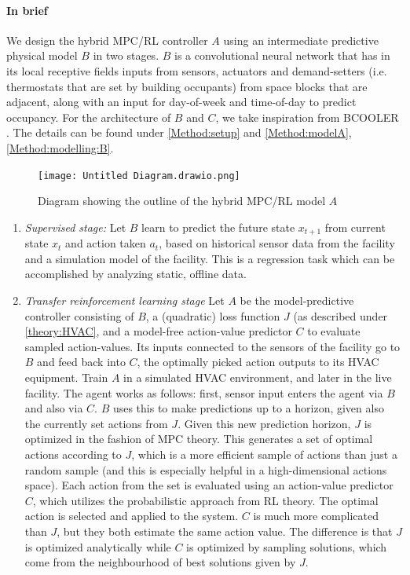 \documentclass{article}
\theoremstyle{definition}
\theoremstyle{remark}
\begin{document}
\paragraph{In brief} We design the hybrid MPC/RL controller $A$ using an intermediate predictive physical model $B$ in two stages. $B$ is a convolutional neural network that has in its local receptive fields inputs from sensors, actuators and demand-setters (i.e. thermostats that are set by building occupants) from space blocks that are adjacent, along with an input for day-of-week and time-of-day to predict occupancy. For the architecture of $B$ and $C$, we take inspiration from BCOOLER \cite{luo2022controlling}. The details can be found under \ref{Method:setup} and \ref{Method:modelA}, \ref{Method:modelling:B}.
\FloatBarrier
\begin{figure}
    \centering
    \texttt{[image: Untitled Diagram.drawio.png]}
    \caption{Diagram showing the outline of the hybrid MPC/RL model $A$}
    \label{fig:my_label}
\end{figure}
\begin{enumerate}
    \item \emph{Supervised stage:} Let $B$ learn to predict the future state $x_{t+1}$ from current state $x_t$ and action taken $a_t$, based on historical sensor data from the facility and a simulation model of the facility. This is a regression task which can be accomplished by analyzing static, offline data.
    \item \emph{Transfer reinforcement learning stage} Let $A$ be the model-predictive controller consisting of $B$, a (quadratic) loss function $J$ (as described under \ref{theory:HVAC}, and a model-free action-value predictor $C$ to evaluate sampled action-values. Its inputs connected to the sensors of the facility go to $B$ and feed back into $C$, the optimally picked action outputs to its HVAC equipment. Train $A$ in a simulated HVAC environment, and later in the live facility. The agent works as follows: first, sensor input enters the agent via $B$ and also via $C$. $B$ uses this to make predictions up to a horizon, given also the currently set actions from $J$. Given this new prediction horizon, $J$ is optimized in the fashion of MPC theory. This generates a set of optimal actions according to $J$, which is a more efficient sample of actions than just a random sample (and this is especially helpful in a high-dimensional actions space). Each action from the set is evaluated using an action-value predictor $C$, which utilizes the probabilistic approach from RL theory. The optimal action is selected and applied to the system. $C$ is much more complicated than $J$, but they both estimate the same action value. The difference is that $J$ is optimized analytically while $C$ is optimized by sampling solutions, which come from the neighbourhood of best solutions given by $J$.
\end{enumerate}
\end{document}
